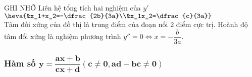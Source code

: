 \vspace{0.4cm}
\begin{khung4}{GHI NHỚ}
	 Liên hệ tổng tích hai nghiệm của $y'$
	$\heva{&x_1+x_2=-\dfrac{2b}{3a}\\&x_1x_2=\dfrac{c}{3a}}$\\
	 Tâm đối xứng của đồ thị là trung điểm của đoạn nối 2 điểm cực trị. Hoành độ tâm đối xứng là nghiệm phương trình $y''=0 \Leftrightarrow x=-\dfrac{b}{3a}$.
\end{khung4}

\subsubsection{Hàm số $\mathbf{y = \dfrac{{ax + b}}{{cx + d}}\left( {c \ne 0,ad - bc \ne 0} \right)}$}

